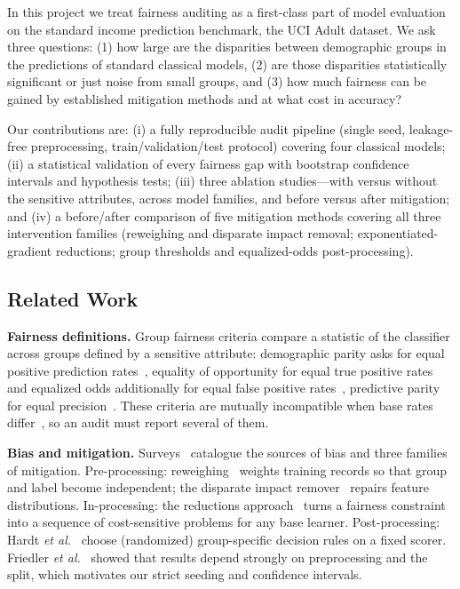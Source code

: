 \documentclass[conference]{IEEEtran}
\begin{document}
In this project we treat fairness auditing as a first-class part of model evaluation on the standard income prediction benchmark, the UCI Adult dataset. We ask three questions: (1) how large are the disparities between demographic groups in the predictions of standard classical models, (2) are those disparities statistically significant or just noise from small groups, and (3) how much fairness can be gained by established mitigation methods and at what cost in accuracy?

Our contributions are: (i) a fully reproducible audit pipeline (single seed, leakage-free preprocessing, train/validation/test protocol) covering four classical models; (ii) a statistical validation of every fairness gap with bootstrap confidence intervals and hypothesis tests; (iii) three ablation studies---with versus without the sensitive attributes, across model families, and before versus after mitigation; and (iv) a before/after comparison of five mitigation methods covering all three intervention families (reweighing and disparate impact removal; exponentiated-gradient reductions; group thresholds and equalized-odds post-processing).

\subsection{Related Work}
\textbf{Fairness definitions.} Group fairness criteria compare a statistic of the classifier across groups defined by a sensitive attribute: demographic parity asks for equal positive prediction rates~\cite{dwork2012}, equality of opportunity for equal true positive rates and equalized odds additionally for equal false positive rates~\cite{hardt2016}, predictive parity for equal precision~\cite{chouldechova2017}. These criteria are mutually incompatible when base rates differ~\cite{kleinberg2017,chouldechova2017}, so an audit must report several of them.

\textbf{Bias and mitigation.} Surveys~\cite{mehrabi2021,pessach2022,barocas2023} catalogue the sources of bias and three families of mitigation. Pre-processing: reweighing~\cite{calders2009,kamiran2012} weights training records so that group and label become independent; the disparate impact remover~\cite{feldman2015} repairs feature distributions. In-processing: the reductions approach~\cite{agarwal2018} turns a fairness constraint into a sequence of cost-sensitive problems for any base learner. Post-processing: Hardt \textit{et al.}~\cite{hardt2016} choose (randomized) group-specific decision rules on a fixed scorer. Friedler \textit{et al.}~\cite{friedler2019} showed that results depend strongly on preprocessing and the split, which motivates our strict seeding and confidence intervals.
\end{document}
